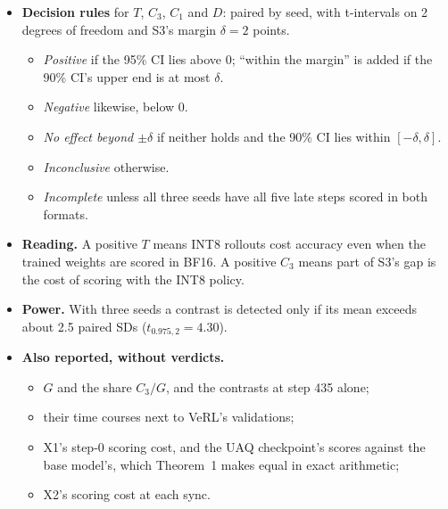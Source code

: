 \documentclass[11pt]{article}
\begin{document}
\begin{itemize}
  If either format fails, every verdict carries ``scorer not validated''.
\item \textbf{Decision rules} for $T$, $C_3$, $C_1$ and $D$: paired by seed, with t-intervals on 2 degrees of freedom and S3's margin $\delta=2$ points.
  \begin{itemize}
  \item \emph{Positive} if the 95\% CI lies above 0; ``within the margin'' is added if the 90\% CI's upper end is at most $\delta$.
  \item \emph{Negative} likewise, below 0.
  \item \emph{No effect beyond $\pm\delta$} if neither holds and the 90\% CI lies within $[-\delta,\delta]$.
  \item \emph{Inconclusive} otherwise.
  \item \emph{Incomplete} unless all three seeds have all five late steps scored in both formats.
  \end{itemize}
\item \textbf{Reading.} A positive $T$ means INT8 rollouts cost accuracy even when the trained weights are scored in BF16. A positive $C_3$ means part of S3's gap is the cost of scoring with the INT8 policy.
\item \textbf{Power.} With three seeds a contrast is detected only if its mean exceeds about 2.5 paired SDs ($t_{0.975,2}=4.30$).
\item \textbf{Also reported, without verdicts.}
  \begin{itemize}
  \item $G$ and the share $C_3/G$, and the contrasts at step 435 alone;
  \item their time courses next to VeRL's validations;
  \item X1's step-0 scoring cost, and the UAQ checkpoint's scores against the base model's, which Theorem~1 makes equal in exact arithmetic;
  \item X2's scoring cost at each sync.
  \end{itemize}
\end{itemize}
\end{document}
